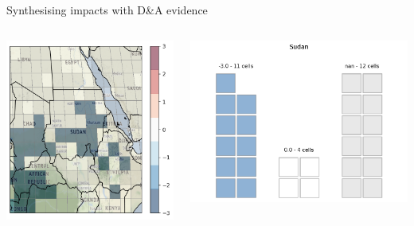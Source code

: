 \documentclass[9pt]{beamer}
\begin{document}
\begin{frame}{Synthesising impacts with D\&A evidence}
\begin{columns}
	\begin{column}{0.4\linewidth}
		\includegraphics[width=\linewidth]{../plots/maps/sudan_precipitation.png}
	\end{column}

	\begin{column}{0.4\linewidth}
		\includegraphics[width=\linewidth]{../plots/maps/sudan_gridcell_count.png}
	\end{column}
\end{columns}


\end{frame}
\end{document}

